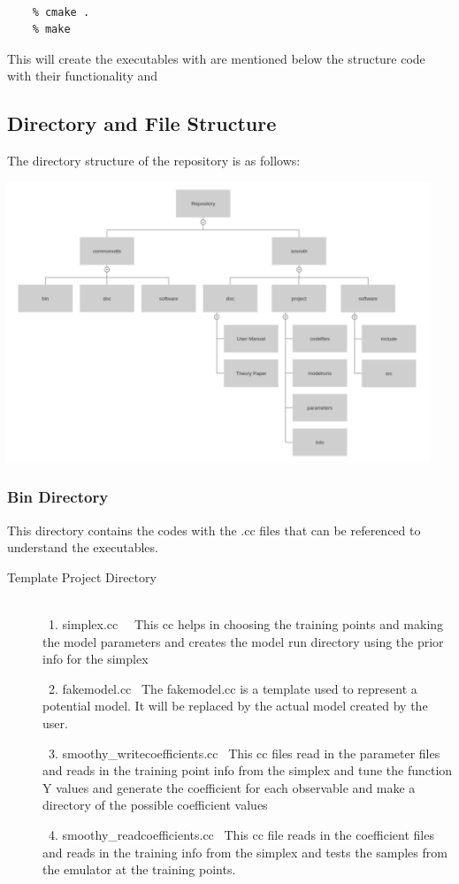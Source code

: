 \documentclass[12pt]{article}
\numberwithin{equation}{section}
\numberwithin{figure}{section}
\begin{document}
{\tt 
\begin{verbatim}
    % cmake . 
    % make  
\end{verbatim}
}

This will create the executables with are mentioned below the structure code with their functionality and 

\subsection{Directory and File Structure}

The directory structure of the repository is as follows: 

\centerline{\includegraphics[width = 0.95\textwidth]{Structure_Tree.png}}


\subsubsection{Bin Directory}

This directory contains the codes with the .cc files that can be referenced to understand the executables.

\begin{description}
\item[Template Project Directory] \\
\ 1. simplex.cc \
\ This cc helps in choosing the training points and making the model parameters and creates the model run directory using the prior info for the simplex 

\ 2. fakemodel.cc 
\ The fakemodel.cc is a template used to represent a potential model. It will be replaced by the actual model created by the user. 

\ 3. smoothy\_writecoefficients.cc 
\ This cc files read in the parameter files and reads in the training point info from the simplex and tune the function Y values and generate the coefficient for each observable and make a directory of the possible coefficient values 

\ 4. smoothy\_readcoefficients.cc 
\ This cc file reads in the coefficient files and reads in the training info from the simplex and tests the samples from the emulator at the training points. 

\end{description}
\end{document}
